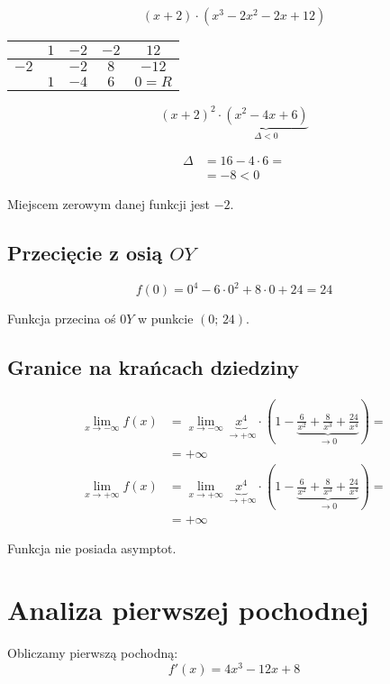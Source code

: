 \documentclass[a4paper,12pt]{article}
\begin{document}
\[ \left(x + 2 \right) \cdot \left( x^3 - 2x^2 - 2x + 12 \right) \]

\begin{center}
	\begin{tabular}{l|c|c|c|c|}

\cline{2-5}

                           & $1$ & $-2$ & $-2$ & $12$    \\ \hline

\multicolumn{1}{|l|}{$-2$} &     & $-2$ & $8$  & $-12$   \\ \hline

                           & $1$ & $-4$ & $6$  & $0 = R$ \\ \cline{2-5} 

\end{tabular}
\end{center}
\begin{minipage}[c]{0.7\textwidth}
	\[ \left(x + 2 \right)^2 \cdot \underbrace{\left( x^2 - 4x + 6 \right)}_{\Delta < 0} \]
\end{minipage}
\hspace{0.15cm} \vline \hspace{0.15cm}
\begin{minipage}[c]{0.2\textwidth}
	\begin{align*}
		\Delta &= 16 - 4 \cdot 6 = \\
		&= -8 < 0
	\end{align*}
\end{minipage}
\vspace{0.5cm}

Miejscem zerowym danej funkcji jest $-2$.

\subsection{Przecięcie z osią $OY$}

\[f \left( 0 \right) = 0^4  - 6\cdot 0^2 + 8\cdot 0 + 24 = 24 \]

Funkcja przecina oś $0Y$ w punkcie $ \left( 0; \, 24 \right)$.

\subsection{Granice na krańcach dziedziny}

\begin{align*}
	\lim\limits_{x \to - \infty} f \left( x \right) &=\lim\limits_{x \to - \infty} \underbrace{x^4}_{\to + \infty} \cdot \left( 1 - \underbrace{\frac{6}{x^2} + \frac{8}{x^3} + \frac{24}{x^4}}_{\to 0} \right) =\\
	&= + \infty \\
	\lim\limits_{x \to + \infty} f\left( x \right) &= \lim\limits_{x \to +\infty} \underbrace{x^4}_{\to + \infty} \cdot \left( 1 - \underbrace{\frac{6}{x^2} + \frac{8}{x^3} + \frac{24}{x^4}}_{\to 0} \right) = \\
	&= + \infty
\end{align*}

Funkcja nie posiada asymptot.

\section{Analiza pierwszej pochodnej}
Obliczamy pierwszą pochodną:
\[ f' \left( x \right) = 4x^3 - 12x + 8 \]
\end{document}
